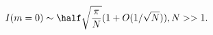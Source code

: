 \begin{equation}
\label{Eq_A26}
I(m=0) \sim \half \sqrt{\frac{\pi}{N}} (1 + O(1/\sqrt{N})), N >> 1.
\end{equation}


